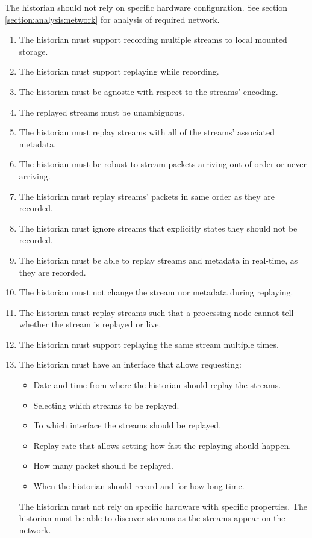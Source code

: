 The historian should not rely on specific hardware configuration. See section \ref{section:analysis:network} for analysis of required network.
 
\begin{enumerate}
	\item The historian must support recording multiple streams to local mounted storage.
	\item The historian must support replaying while recording.
	\item The historian must be agnostic with respect to the streams' encoding.
	\item The replayed streams must be unambiguous.
	\item The historian must replay streams with all of the streams' associated metadata.
	\item The historian must be robust to stream packets arriving out-of-order or never arriving.
	\item The historian must replay streams' packets in same order as they are recorded.
	\item The historian must ignore streams that explicitly states they should not be recorded.
	\item The historian must be able to replay streams and metadata in real-time, as they are recorded.
	\item The historian must not change the stream nor metadata during replaying.
	\item The historian must replay streams such that a processing-node cannot tell whether the stream is replayed or live.
	\item The historian must support replaying the same stream multiple times.
	\item The historian must have an interface that allows requesting:
	\begin{itemize}
		\item Date and time from where the historian should replay the streams.
		\item Selecting which streams to be replayed.
		\item To which interface the streams should be replayed. 
		\item Replay rate that allows setting how fast the replaying should happen. 
		\item How many packet should be replayed.
		\item When the historian should record and for how long time.
	\end{itemize}
	The historian must not rely on specific hardware with specific properties.
	The historian must be able to discover streams as the streams appear on the network.
\end{enumerate}

